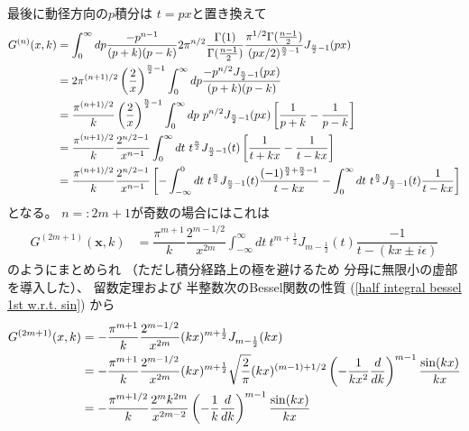 最後に動径方向の$p$積分は
$t = p x$と置き換えて
\begin{align}
    G^{(n)}( \bm{x}, k )
&=
    \int_0^\infty d p
        \dfrac{
            - p^{n-1}
        }{(p + k)(p - k)}
    2 \pi^{n/2}
        \dfrac{ \Gamma(1) }
            { \Gamma(\frac{n-1}{2}) }
    \dfrac{
        \pi^{1/2}
        \Gamma(
            \frac{n-1}{2}
        )
    } { (px/2)^{ \frac{n}{2} - 1 } }
    J_{ \frac{n}{2} - 1 } (px)
\notag\\&
=
    2 \pi^{(n+1)/2}
    \left(
        \dfrac{2}{x}
    \right)^{ \frac{n}{2} - 1 }
    \int_0^\infty d p
        \dfrac{
            - p^{n/2}
            J_{ \frac{n}{2} - 1 } (px)
        }{(p + k)(p - k)}
\notag\\&
=
    \dfrac{ \pi^{(n+1)/2} }{ k }
    \left(
        \dfrac{2}{x}
    \right)^{ \frac{n}{2} - 1 }
    \int_0^\infty d p\ 
        p^{n/2}
        J_{ \frac{n}{2} - 1 } (px)
    \left[
        \dfrac{ 1 }{p + k}
    -
        \dfrac{ 1 }{p - k}
    \right]
\notag\\&
=
    \dfrac{ \pi^{(n+1)/2} }{ k }
        \dfrac{2^{ n/2 - 1 }}{ x^{n-1} }
    \int_0^\infty d t\ 
        t^{ \frac{n}{2} }
        J_{ \frac{n}{2} - 1 } (t)
    \left[
        \dfrac{ 1 }{t + k x}
    -
        \dfrac{ 1 }{t - k x}
    \right]
\notag\\&
=
    \dfrac{ \pi^{(n+1)/2} }{ k }
        \dfrac{2^{ n/2 - 1 }}{ x^{n-1} }
    \left[
    -
    \int_{- \infty}^0 d t\ 
        t^{ \frac{n}{2} }
        J_{ \frac{n}{2} - 1 } (t)
        \dfrac{
            (-1)^{\frac{n}{2} + \frac{n}{2} - 1 }
        }{t - k x}
    -
    \int_0^\infty d t\ 
        t^{ \frac{n}{2} }
        J_{ \frac{n}{2} - 1 } (t)
        \dfrac{ 1 }{t - k x}
    \right]
\end{align}
となる。
$n =: 2m + 1$が奇数の場合にはこれは
\begin{align}
    G^{(2m+1)}( \bm{x}, k )
&=
    \dfrac{ \pi^{m+1} }{ k }
        \dfrac{2^{ m - 1/2 }}{ x^{2m} }
    \int_{- \infty}^\infty d t\ 
        t^{ m + \frac{1}{2} }
        J_{ m - \frac{1}{2} } (t)
        \dfrac{ - 1
        }{ t - (k x \pm i \epsilon) }
\end{align}
のようにまとめられ
（ただし積分経路上の極を避けるため
分母に無限小の虚部を導入した）、
留数定理および
半整数次のBessel関数の性質
(\ref{half integral bessel 1st w.r.t. sin})
から
\begin{align}
    G^{(2m+1)}( x, k )
&=
    - \dfrac{ \pi^{m+1} }{ k }
        \dfrac{2^{ m - 1/2 }}{ x^{2m} }
    (k x)^{ m + \frac{1}{2} }
    J_{ m - \frac{1}{2} } (k x)
\notag\\&
=
    - \dfrac{ \pi^{m+1} }{ k }
        \dfrac{2^{ m - 1/2 }}{ x^{2m} }
    (k x)^{ m + \frac{1}{2} }
    \sqrt{ \dfrac{2}{\pi} }
    (k x)^{(m-1) + 1/2}
    \left(
        - \dfrac{1}{kx^2}
        \dfrac{d}{dk}
    \right)^{m-1}
    \dfrac{\sin (k x)}{ k x }
\notag\\&
=
    - \dfrac{ \pi^{m + 1/2} }{ k }
        \dfrac{
            2^{ m }
            k^{ 2 m }
        }{ x^{2 m - 2} }
    \left(
        - \dfrac{1}{k}
        \dfrac{d}{dk}
    \right)^{m-1}
    \dfrac{\sin (k x)}{ k x }
\end{align}
